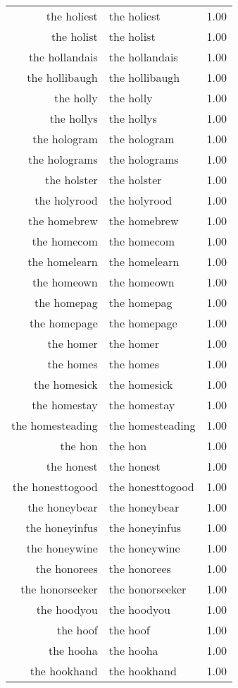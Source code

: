 \begin{table}[ht]
\begin{tabular}{rlr}
  the holiest & the holiest & 1.00 \\ 
  the holist & the holist & 1.00 \\ 
  the hollandais & the hollandais & 1.00 \\ 
  the hollibaugh & the hollibaugh & 1.00 \\ 
  the holly & the holly & 1.00 \\ 
  the hollys & the hollys & 1.00 \\ 
  the hologram & the hologram & 1.00 \\ 
  the holograms & the holograms & 1.00 \\ 
  the holster & the holster & 1.00 \\ 
  the holyrood & the holyrood & 1.00 \\ 
  the homebrew & the homebrew & 1.00 \\ 
  the homecom & the homecom & 1.00 \\ 
  the homelearn & the homelearn & 1.00 \\ 
  the homeown & the homeown & 1.00 \\ 
  the homepag & the homepag & 1.00 \\ 
  the homepage & the homepage & 1.00 \\ 
  the homer & the homer & 1.00 \\ 
  the homes & the homes & 1.00 \\ 
  the homesick & the homesick & 1.00 \\ 
  the homestay & the homestay & 1.00 \\ 
  the homesteading & the homesteading & 1.00 \\ 
  the hon & the hon & 1.00 \\ 
  the honest & the honest & 1.00 \\ 
  the honesttogood & the honesttogood & 1.00 \\ 
  the honeybear & the honeybear & 1.00 \\ 
  the honeyinfus & the honeyinfus & 1.00 \\ 
  the honeywine & the honeywine & 1.00 \\ 
  the honorees & the honorees & 1.00 \\ 
  the honorseeker & the honorseeker & 1.00 \\ 
  the hoodyou & the hoodyou & 1.00 \\ 
  the hoof & the hoof & 1.00 \\ 
  the hooha & the hooha & 1.00 \\ 
  the hookhand & the hookhand & 1.00 \\ 

\end{tabular}
\end{table}
